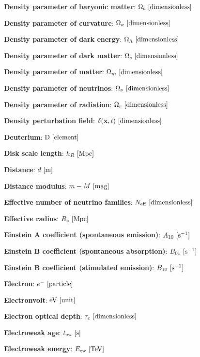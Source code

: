 \documentclass[a4paper,11pt]{article}
\begin{document}
{\noindent}\textbf{Density parameter of baryonic matter}: $\Omega_b ~
[{\rm dimensionless}]$

{\noindent}\textbf{Density parameter of curvature}: $\Omega_\kappa ~ [{\rm dimensionless}]$

{\noindent}\textbf{Density parameter of dark energy}: $\Omega_\Lambda ~ [{\rm dimensionless}]$

{\noindent}\textbf{Density parameter of dark matter}: $\Omega_c ~ [{\rm dimensionless}]$

{\noindent}\textbf{Density parameter of matter}: $\Omega_m ~ [{\rm dimensionless}]$

{\noindent}\textbf{Density parameter of neutrinos}: $\Omega_\nu ~ [{\rm dimensionless}]$

{\noindent}\textbf{Density parameter of radiation}: $\Omega_r ~ [{\rm dimensionless}]$

{\noindent}\textbf{Density perturbation field}: $\delta(\mathbf{x},t) ~ [{\rm dimensionless}]$

{\noindent}\textbf{Deuterium}: ${\rm D} ~ [{\rm element}]$

{\noindent}\textbf{Disk scale length}: $h_R ~ [{\rm Mpc}]$

{\noindent}\textbf{Distance}: $d ~ [{\rm m}]$

{\noindent}\textbf{Distance modulus}: $m - M ~ [{\rm mag}]$

{\noindent}\textbf{Effective number of neutrino families}: $N_\mathrm{eff} ~ [{\rm dimensionless}]$

{\noindent}\textbf{Effective radius}: $R_e ~ [{\rm Mpc}]$

{\noindent}\textbf{Einstein A coefficient (spontaneous emission)}: $A_{10} ~ [{\rm s^{-1}}]$

{\noindent}\textbf{Einstein B coefficient (spontaneous absorption)}: $B_{01} ~ [{\rm s^{-1}}]$

{\noindent}\textbf{Einstein B coefficient (stimulated emission)}: $B_{10} ~ [{\rm s^{-1}}]$

{\noindent}\textbf{Electron}: $e^- ~ [{\rm particle}]$

{\noindent}\textbf{Electronvolt}: ${\rm eV} ~ [{\rm unit}]$

{\noindent}\textbf{Electron optical depth}: $\tau_e ~ [{\rm dimensionless}]$

{\noindent}\textbf{Electroweak age}: $t_\mathrm{ew} ~ [{\rm s}]$

{\noindent}\textbf{Electroweak energy}: $E_\mathrm{ew} ~ [{\rm TeV}]$
\end{document}

